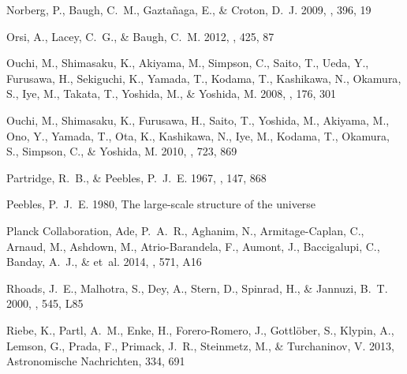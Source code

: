 \documentclass{emulateapj}
\begin{document}
\begin{thebibliography}{39}
{Norberg}, P., {Baugh}, C.~M., {Gazta{\~n}aga}, E., \& {Croton}, D.~J. 2009,
  \mnras, 396, 19

{Orsi}, A., {Lacey}, C.~G., \& {Baugh}, C.~M. 2012, \mnras, 425, 87

{Ouchi}, M., {Shimasaku}, K., {Akiyama}, M., {Simpson}, C., {Saito}, T.,
  {Ueda}, Y., {Furusawa}, H., {Sekiguchi}, K., {Yamada}, T., {Kodama}, T.,
  {Kashikawa}, N., {Okamura}, S., {Iye}, M., {Takata}, T., {Yoshida}, M., \&
  {Yoshida}, M. 2008, \apjs, 176, 301

{Ouchi}, M., {Shimasaku}, K., {Furusawa}, H., {Saito}, T., {Yoshida}, M.,
  {Akiyama}, M., {Ono}, Y., {Yamada}, T., {Ota}, K., {Kashikawa}, N., {Iye},
  M., {Kodama}, T., {Okamura}, S., {Simpson}, C., \& {Yoshida}, M. 2010, \apj,
  723, 869

{Partridge}, R.~B., \& {Peebles}, P.~J.~E. 1967, \apj, 147, 868

{Peebles}, P.~J.~E. 1980, {The large-scale structure of the universe}

{Planck Collaboration}, {Ade}, P.~A.~R., {Aghanim}, N., {Armitage-Caplan}, C.,
  {Arnaud}, M., {Ashdown}, M., {Atrio-Barandela}, F., {Aumont}, J.,
  {Baccigalupi}, C., {Banday}, A.~J., \& et~al. 2014, \aap, 571, A16

{Rhoads}, J.~E., {Malhotra}, S., {Dey}, A., {Stern}, D., {Spinrad}, H., \&
  {Jannuzi}, B.~T. 2000, \apjl, 545, L85
  


Riebe, K., Partl, A.~M., Enke, H., Forero-Romero, J., Gottlöber, S., Klypin,
  A., Lemson, G., Prada, F., Primack, J.~R., Steinmetz, M., \& Turchaninov, V.
  2013, Astronomische Nachrichten, 334, 691


\end{thebibliography}
\end{document}
